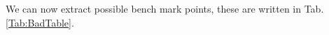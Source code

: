 \documentclass[10pt]{book}
\renewcommand{\(}{\left(}
\renewcommand{\)}{\right)}
\renewcommand{\[}{\left[}
\renewcommand{\]}{\right]}
\begin{document}
We can now extract possible bench mark points, these are written in Tab.\,\ref{Tab:BadTable}.
%

%
\end{document}
